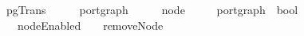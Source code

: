 \ pgTrans\ {\isacharcolon}{\isacharcolon}\ {\isachardoublequoteopen}{\isacharparenleft}\ \ \ \ port{\isacharunderscore}graph\ {\isasymRightarrow}\ {\isacharparenleft}\ \ \ \ node\isanewline
{}\ {\isacharparenleft}\ \ \ \ port{\isacharunderscore}graph\ {\isasymRightarrow}\ bool{\isachardoublequoteclose}\isanewline
\ \ \ {\isachardoublequoteopen}{\isasymlbrakk}nodeEnabled\ \ \ {\isacharequal}\ removeNode\ \ {\isasymLongrightarrow}\ \ 
